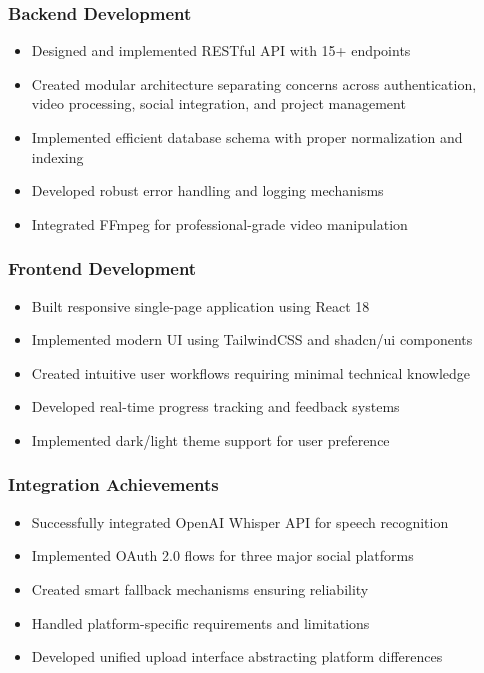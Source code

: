\subsubsection{Backend Development}

\begin{itemize}
    \item Designed and implemented RESTful API with 15+ endpoints
    \item Created modular architecture separating concerns across authentication, video processing, social integration, and project management
    \item Implemented efficient database schema with proper normalization and indexing
    \item Developed robust error handling and logging mechanisms
    \item Integrated FFmpeg for professional-grade video manipulation
\end{itemize}

\subsubsection{Frontend Development}

\begin{itemize}
    \item Built responsive single-page application using React 18
    \item Implemented modern UI using TailwindCSS and shadcn/ui components
    \item Created intuitive user workflows requiring minimal technical knowledge
    \item Developed real-time progress tracking and feedback systems
    \item Implemented dark/light theme support for user preference
\end{itemize}

\subsubsection{Integration Achievements}

\begin{itemize}
    \item Successfully integrated OpenAI Whisper API for speech recognition
    \item Implemented OAuth 2.0 flows for three major social platforms
    \item Created smart fallback mechanisms ensuring reliability
    \item Handled platform-specific requirements and limitations
    \item Developed unified upload interface abstracting platform differences
\end{itemize}


